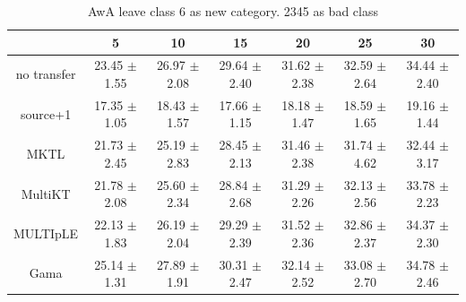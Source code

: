 \begin{table}[htbp]
  \centering
  \caption{AwA leave class 6 as new category. 2345 as bad class}
    \begin{tabular}{ccccccc}
    \toprule
          & 5     & 10    & 15    & 20    & 25    & 30 \\
    \midrule
    no transfer &         23.45 $\pm$ 1.55 &         26.97 $\pm$ 2.08 &         29.64 $\pm$ 2.40 &         31.62 $\pm$ 2.38 &         32.59 $\pm$ 2.64 &         34.44 $\pm$ 2.40 \\
    source+1    &         17.35 $\pm$ 1.05 &         18.43 $\pm$ 1.57 &         17.66 $\pm$ 1.15 &         18.18 $\pm$ 1.47 &         18.59 $\pm$ 1.65 &         19.16 $\pm$ 1.44 \\
    MKTL        &         21.73 $\pm$ 2.45 &         25.19 $\pm$ 2.83 &         28.45 $\pm$ 2.13 &         31.46 $\pm$ 2.38 &         31.74 $\pm$ 4.62 &         32.44 $\pm$ 3.17 \\
    MultiKT     &         21.78 $\pm$ 2.08 &         25.60 $\pm$ 2.34 &         28.84 $\pm$ 2.68 &         31.29 $\pm$ 2.26 &         32.13 $\pm$ 2.56 &         33.78 $\pm$ 2.23 \\
    MULTIpLE    &         22.13 $\pm$ 1.83 &         26.19 $\pm$ 2.04 &         29.29 $\pm$ 2.39 &         31.52 $\pm$ 2.36 &         32.86 $\pm$ 2.37 &         34.37 $\pm$ 2.30 \\
    Gama        &         25.14 $\pm$ 1.31 &         27.89 $\pm$ 1.91 &         30.31 $\pm$ 2.47 &         32.14 $\pm$ 2.52 &         33.08 $\pm$ 2.70 &         34.78 $\pm$ 2.46 \\
    \bottomrule
    \end{tabular}%
\end{table}%

